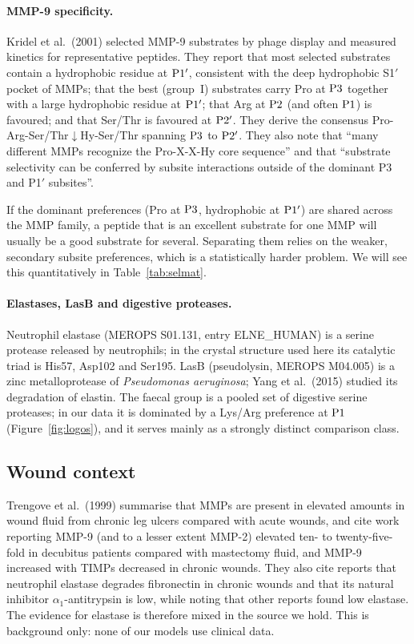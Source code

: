 \paragraph{MMP-9 specificity.} Kridel et al.\ (2001) selected MMP-9 substrates by phage display and measured kinetics for representative peptides. They report that most selected substrates contain a hydrophobic residue at $\mathrm{P}1'$, consistent with the deep hydrophobic S1$'$ pocket of MMPs; that the best (group~I) substrates carry Pro at $\mathrm{P}3$ together with a large hydrophobic residue at $\mathrm{P}1'$; that Arg at $\mathrm{P}2$ (and often $\mathrm{P}1$) is favoured; and that Ser/Thr is favoured at $\mathrm{P}2'$. They derive the consensus Pro-Arg-Ser/Thr$\downarrow$Hy-Ser/Thr spanning $\mathrm{P}3$ to $\mathrm{P}2'$. They also note that ``many different MMPs recognize the Pro-X-X-Hy core sequence'' and that ``substrate selectivity can be conferred by subsite interactions outside of the dominant P3 and P1$'$ subsites''.

\begin{bionote}
If the dominant preferences (Pro at $\mathrm{P}3$, hydrophobic at $\mathrm{P}1'$) are shared across the MMP family, a peptide that is an excellent substrate for one MMP will usually be a good substrate for several. Separating them relies on the weaker, secondary subsite preferences, which is a statistically harder problem. We will see this quantitatively in Table~\ref{tab:selmat}.
\end{bionote}

\paragraph{Elastases, LasB and digestive proteases.} Neutrophil elastase (MEROPS S01.131, entry ELNE\_HUMAN) is a serine protease released by neutrophils; in the crystal structure used here its catalytic triad is His57, Asp102 and Ser195. LasB (pseudolysin, MEROPS M04.005) is a zinc metalloprotease of \emph{Pseudomonas aeruginosa}; Yang et al.\ (2015) studied its degradation of elastin. The faecal group is a pooled set of digestive serine proteases; in our data it is dominated by a Lys/Arg preference at $\mathrm{P}1$ (Figure~\ref{fig:logos}), and it serves mainly as a strongly distinct comparison class.

\subsection{Wound context}
Trengove et al.\ (1999) summarise that MMPs are present in elevated amounts in wound fluid from chronic leg ulcers compared with acute wounds, and cite work reporting MMP-9 (and to a lesser extent MMP-2) elevated ten- to twenty-five-fold in decubitus patients compared with mastectomy fluid, and MMP-9 increased with TIMPs decreased in chronic wounds. They also cite reports that neutrophil elastase degrades fibronectin in chronic wounds and that its natural inhibitor $\alpha_1$-antitrypsin is low, while noting that other reports found low elastase. The evidence for elastase is therefore mixed in the source we hold. This is background only: none of our models use clinical data.

